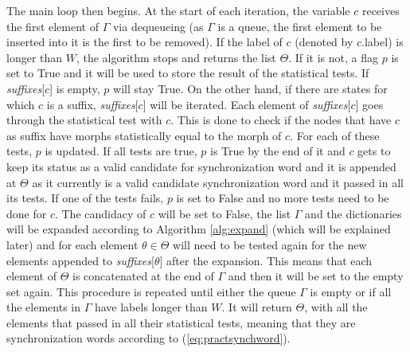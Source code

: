 {The main loop then begins. At the start of each iteration, the variable $c$ receives the first element of $\Gamma$ via dequeueing (as $\Gamma$ is a queue, the first element to be inserted into it is the first to be removed). If the label of $c$ (denoted by $c$.label) is longer than $W$, the algorithm stops and returns the list $\Theta$. If it is not, a flag $p$ is set to True and it will be used to store the result of the statistical tests. If \textit{suffixes}[$c$] is empty, $p$ will stay True. On the other hand, if there are states for which $c$ is a suffix, \textit{suffixes}[$c$] will be iterated. Each element of \textit{suffixes}[$c$] goes through the statistical test with $c$. This is done to check if the nodes that have $c$ as suffix have morphs statistically equal to the morph of $c$. For each of these tests, $p$ is updated. If all tests are true, $p$ is True by the end of it and $c$ gets to keep its status as a valid candidate for synchronization word and it is appended at $\Theta$ as it currently is a valid candidate synchronization word and it passed in all its tests. If one of the tests fails, $p$ is set to False and no more tests need to be done for $c$. The candidacy of $c$ will be set to False, the list $\Gamma$ and the dictionaries will be expanded according to Algorithm \ref{alg:expand} (which will be explained later) and for each element $\theta \in \Theta$ will need to be tested again for the new elements appended to \textit{suffixes}[$\theta$] after the expansion. This means that each element of $\Theta$ is concatenated at the end of $\Gamma$ and then it will be set to the empty set again. This procedure is repeated until either the queue $\Gamma$ is empty or if all the elements in $\Gamma$ have labels longer than $W$. It will return $\Theta$, with all the elements that passed in all their statistical tests, meaning that they are synchronization words according to (\ref{eq:practsynchword}). 

}
